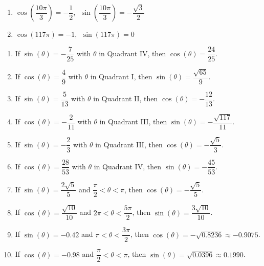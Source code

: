 \begin{multicols}{2}

\begin{enumerate}

\setcounter{enumi}{\value{HW}}

\item $\cos\left(\dfrac{10\pi}{3}\right) = -\dfrac{1}{2}$, $\; \sin \left(\dfrac{10\pi}{3}\right) = -\dfrac{\sqrt{3}}{2}$

\item $\cos(117\pi) = -1$, $\; \sin(117\pi) = 0$ 

\setcounter{HW}{\value{enumi}}

\end{enumerate}

\end{multicols}

\begin{enumerate}

\setcounter{enumi}{\value{HW}}

\item If $\sin(\theta) = -\dfrac{7}{25}$ with $\theta$ in Quadrant IV, then $\cos(\theta) = \dfrac{24}{25}$.
\item If $\cos(\theta) = \dfrac{4}{9}$ with $\theta$ in Quadrant I, then $\sin(\theta) = \dfrac{\sqrt{65}}{9}$.
\item If $\sin(\theta) = \dfrac{5}{13}$ with $\theta$ in Quadrant II, then $\cos(\theta) = -\dfrac{12}{13}$.
\item If $\cos(\theta) = -\dfrac{2}{11}$ with $\theta$ in Quadrant III, then $\sin(\theta) = -\dfrac{\sqrt{117}}{11}$.
\item If $\sin(\theta) = -\dfrac{2}{3}$ with $\theta$ in Quadrant III, then $\cos(\theta) = -\dfrac{\sqrt{5}}{3}$.
\item If $\cos(\theta) = \dfrac{28}{53}$ with $\theta$ in Quadrant IV, then $\sin(\theta) = -\dfrac{45}{53}$.
\item  If $\sin(\theta) = \dfrac{2\sqrt{5}}{5}$ and $\dfrac{\pi}{2} < \theta < \pi$, then $\cos(\theta) = -\dfrac{\sqrt{5}}{5}$.
\item  If $\cos(\theta) = \dfrac{\sqrt{10}}{10}$ and $2\pi < \theta < \dfrac{5\pi}{2}$, then $\sin(\theta)  = \dfrac{3 \sqrt{10}}{10}$.
\item  If $\sin(\theta) = -0.42$ and $\pi < \theta < \dfrac{3\pi}{2}$, then $\cos(\theta) = -\sqrt{0.8236} \approx -0.9075$.
\item  If $\cos(\theta) = -0.98$ and $\dfrac{\pi}{2} < \theta < \pi$, then $\sin(\theta) = \sqrt{0.0396} \approx 0.1990$.

\setcounter{HW}{\value{enumi}}

\end{enumerate}

